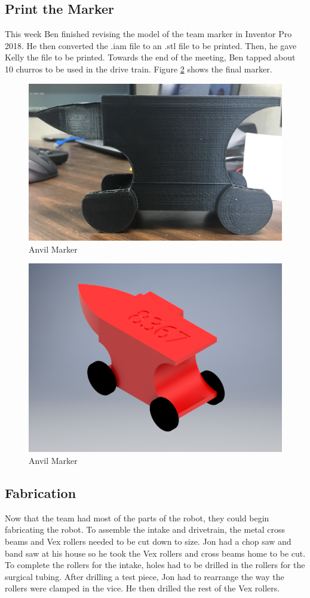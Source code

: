 \documentclass{article}
\newif\ifcontents
\begin{document}
\contentsfalse

\subsection{Print the Marker}
This week Ben finished revising the model of the team marker in Inventor Pro 2018. He then converted the .iam file to an .stl file to be printed. Then, he gave Kelly the file to be printed. Towards the end of the meeting, Ben tapped about 10 churros to be used in the drive train. Figure \ref{fig:marker} shows the final marker. 

\begin{figure}
    \centering
    \includegraphics[width=.6 \textwidth]{09_10-29/images/anvil_marker.jpg}
    \caption{Anvil Marker}
    \label{fig:marker}
\end{figure}

\begin{figure}
    \centering
    \includegraphics[width=.6 \textwidth]{09_10-29/images/REAL_anvil_marker[1].png}
    \caption{Anvil Marker}
    \label{fig:marker}
\end{figure}

\subsection{Fabrication}
Now that the team had most of the parts of the robot, they could begin fabricating the robot. To assemble the intake and drivetrain, the metal cross beams and Vex rollers needed to be cut down to size. Jon had a chop saw and band saw at his house so he took the Vex rollers and cross beams home to be cut. To complete the rollers for the intake, holes had to be drilled in the rollers for the surgical tubing. After drilling a test piece, Jon had to rearrange the way the rollers were clamped in the vice. He then drilled the rest of the Vex rollers.
\end{document}
